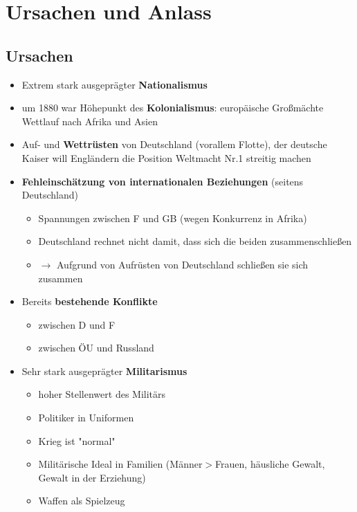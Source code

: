 \documentclass[a4paper, ngerman]{article}
\begin{document}
\section*{Ursachen und Anlass}
\subsection*{Ursachen}
\begin{itemize}
    \item Extrem stark ausgeprägter \textbf{Nationalismus}
    \item um 1880 war Höhepunkt des \textbf{Kolonialismus}: europäische Großmächte Wettlauf nach Afrika und Asien
    \item Auf- und \textbf{Wettrüsten} von Deutschland (vorallem Flotte), der deutsche Kaiser will Engländern die Position Weltmacht Nr.1 streitig machen
    \item \textbf{Fehleinschätzung von internationalen Beziehungen} (seitens Deutschland)
          \begin{itemize}
              \item Spannungen zwischen F und GB (wegen Konkurrenz in Afrika)
              \item Deutschland rechnet nicht damit, dass sich die beiden zusammenschließen
              \item $\rightarrow$ Aufgrund von Aufrüsten von Deutschland schließen sie sich zusammen
          \end{itemize}
    \item Bereits \textbf{bestehende Konflikte}
          \begin{itemize}
              \item zwischen D und F
              \item zwischen ÖU und Russland
          \end{itemize}
    \item Sehr stark ausgeprägter \textbf{Militarismus}
          \begin{itemize}
              \item hoher Stellenwert des Militärs
              \item Politiker in Uniformen
              \item Krieg ist "normal"
              \item Militärische Ideal in Familien (Männer$>$Frauen, häusliche Gewalt, Gewalt in der Erziehung)
              \item Waffen als Spielzeug
          \end{itemize}
\end{itemize}
\end{document}
